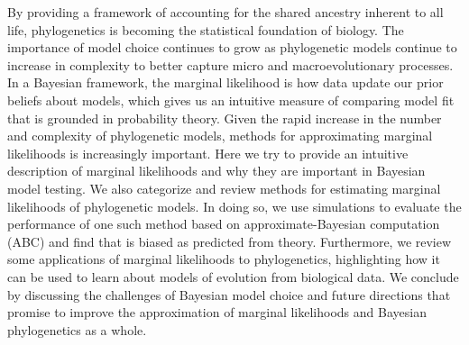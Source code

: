 By providing a framework of accounting for the shared ancestry inherent to all
life,
phylogenetics is becoming the statistical foundation of biology.
The importance of model choice continues to grow as phylogenetic models
continue to increase in complexity to better capture micro and
macroevolutionary processes.
In a Bayesian framework, 
the marginal likelihood is how data update our prior beliefs about models,
which gives us an intuitive measure of comparing model fit that is grounded in
probability theory.
Given the rapid increase in the number and complexity of phylogenetic models,
methods for approximating marginal likelihoods is increasingly important.
Here we try to provide an intuitive description of marginal likelihoods and why
they are important in Bayesian model testing.
We also categorize and review methods for estimating marginal likelihoods of
phylogenetic models.
In doing so, we use simulations to evaluate the performance of one such method
based on approximate-Bayesian computation (ABC) and find that is biased as
predicted from theory.
Furthermore, we review some applications of marginal likelihoods to
phylogenetics, highlighting how it can be used to learn about models of
evolution from biological data.
We conclude by discussing the challenges of Bayesian model choice and future
directions that promise to improve the approximation of marginal likelihoods
and Bayesian phylogenetics as a whole.
